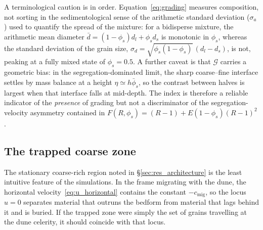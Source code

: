 \documentclass[lineno]{JFM-FLM_Au}
\begin{document}
A terminological caution is in order. Equation~\eqref{eq:grading} measures {composition}, not sorting in the sedimentological sense of the arithmetic standard deviation ($\sigma_a$) used to quantify the spread of the mixture: for a bidisperse mixture, the arithmetic mean diameter $\bar{d} = (1-\phi_s)d_l + \phi_s d_s$ is monotonic in $\phi_s$, whereas the standard deviation of the grain size, $\sigma_d = \sqrt{\phi_s(1-\phi_s)}\,(d_l-d_s)$, is not, peaking at a fully mixed state of $\phi_s = 0.5$. A further caveat is that $\mathcal{G}$ carries a geometric bias: in the segregation-dominated limit, the sharp coarse--fine interface settles by mass balance at a height $\eta \simeq h\bar{\phi}_s$, so the contrast between halves is largest when that interface falls at mid-depth. The index is therefore a reliable indicator of the \emph{presence} of grading but not a discriminator of the segregation-velocity asymmetry contained in $F(R,\phi_s) = (R-1) + E(1-\phi_s)(R-1)^2$.

\subsection{The trapped coarse zone}
\label{sec:res_trapped}

The stationary coarse-rich region noted in \S\ref{sec:res_architecture} is the least intuitive feature of the simulations. 
In the frame migrating with the dune, the horizontal velocity~\eqref{eq:u_horizontal} contains the constant $-c_{\mathrm{mig}}$, so the locus $u = 0$ separates material that
outruns the bedform from material that lags behind it and is buried. If the
trapped zone were simply the set of grains travelling at the dune celerity, it should coincide with that locus.
\end{document}
